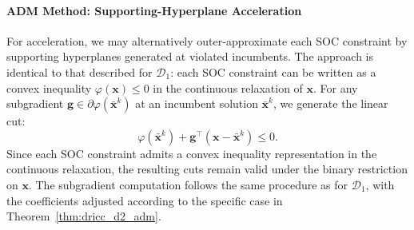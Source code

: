 \documentclass[preprint,12pt,authoryear]{elsarticle}
\begin{document}


\paragraph{ADM Method: Supporting-Hyperplane Acceleration}
For acceleration, we may alternatively outer-approximate each SOC constraint by supporting hyperplanes generated at violated incumbents. The approach is identical to that described for $\mathcal{D}_1$: each SOC constraint can be written as a convex inequality $\varphi(\mathbf{x}) \leqslant 0$ in the continuous relaxation of $\mathbf{x}$. For any subgradient $\mathbf{g} \in \partial \varphi(\bar{\mathbf{x}}^k)$ at an incumbent solution $\bar{\mathbf{x}}^k$, we generate the linear cut:
\begin{equation}
\varphi(\bar{\mathbf{x}}^k) + \mathbf{g}^\top (\mathbf{x} - \bar{\mathbf{x}}^k) \leqslant 0.
\end{equation}
Since each SOC constraint admits a convex inequality representation in the continuous relaxation, the resulting cuts remain valid under the binary restriction on $\mathbf{x}$. The subgradient computation follows the same procedure as for $\mathcal{D}_1$, with the coefficients adjusted according to the specific case in Theorem~\ref{thm:dricc_d2_adm}.


\end{document}
